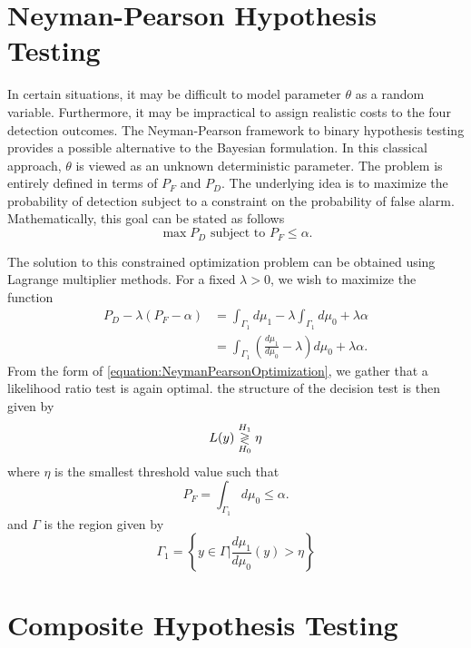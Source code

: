 \section{Neyman-Pearson Hypothesis Testing}

In certain situations, it may be difficult to model parameter $\theta$ as a random variable.
Furthermore, it may be impractical to assign realistic costs to the four detection outcomes.
The Neyman-Pearson framework to binary hypothesis testing provides a possible alternative to the Bayesian formulation.
In this classical approach, $\theta$ is viewed as an unknown deterministic parameter.
The problem is entirely defined in terms of $P_F$ and $P_D$.
The underlying idea is to maximize the probability of detection subject to a constraint on the probability of false alarm.
Mathematically, this goal can be stated as follows
\begin{equation*}
\max P_D \text{ subject to } P_F \leq \alpha .
\end{equation*}

The solution to this constrained optimization problem can be obtained using Lagrange multiplier methods.
For a fixed $\lambda > 0$, we wish to maximize the function
\begin{equation} \label{equation:NeymanPearsonOptimization}
\begin{split}
P_D - \lambda (P_F - \alpha)
&= \int_{\Gamma_1} d\mu_1 - \lambda \int_{\Gamma_1} d\mu_0 + \lambda \alpha \\
&= \int_{\Gamma_1} \left( \frac{d\mu_1}{d\mu_0}  - \lambda \right) d\mu_0
+ \lambda \alpha .
\end{split}
\end{equation}
From the form of \eqref{equation:NeymanPearsonOptimization}, we gather that a likelihood ratio test is again optimal.
the structure of the decision test is then given by
\begin{equation*}
L(y) \overset{H_1}{ \underset{H_0}{\gtrless} } \eta
\end{equation*}
where $\eta$ is the smallest threshold value such that
\begin{equation*}
P_F = \int_{\Gamma_1} d\mu_0 \leq \alpha .
\end{equation*}
and $\Gamma$ is the region given by
\begin{equation*}
\Gamma_1 = \left\{ y \in \Gamma \bigg| \frac{d\mu_1}{d\mu_0}(y) > \eta \right\}
\end{equation*}

\section{Composite Hypothesis Testing}

